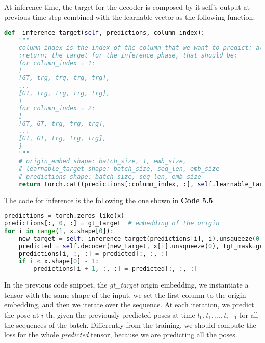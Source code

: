 At inference time, the target for the decoder is composed by it-self's output at previous time step combined with the learnable vector as the following function:
\begin{lstlisting}[captionpos=b, label={lst:lst-inference-target}, caption={Inference target}, language=Python]
def _inference_target(self, predictions, column_index):
    """
    column_index is the index of the column that we want to predict: always 0 < x < seq_len
    :return: the target for the inference phase, that should be:
    for column_index = 1:
    [
    [GT, trg, trg, trg, trg],
    ...
    [GT, trg, trg, trg, trg],
    ]
    for column_index = 2:
    [
    [GT, GT, trg, trg, trg],
    ...
    [GT, GT, trg, trg, trg],
    ]
    """
    # origin_embed shape: batch_size, 1, emb_size,
    # learnable_target shape: batch_size, seq_len, emb_size
    # predictions shape: batch_size, seq_len, emb_size
    return torch.cat((predictions[:column_index, :], self.learnable_target[column_index:, :]), dim=0)
\end{lstlisting}

The code for inference is the following the one shown in \textbf{Code 5.5}.
\begin{lstlisting}[captionpos=b, label={lst:lst-inference}, caption={Inference}, language=Python]
predictions = torch.zeros_like(x)
predictions[:, 0, :] = gt_target  # embedding of the origin
for i in range(1, x.shape[0]):
    new_target = self._inference_target(predictions[i], i).unsqueeze(0)
    predicted = self.decoder(new_target, x[i].unsqueeze(0), tgt_mask=generate_upper_triangular_mask(x.shape).to(self.device))
    predictions[i, :, :] = predicted[:, :, :]
    if i < x.shape[0] - 1:
        predictions[i + 1, :, :] = predicted[:, :, :]
\end{lstlisting}
In the previous code snippet, the \textit{gt\_target} origin embedding, we instantiate a tensor with the same shape of the input, we set the first column to the origin embedding, and then we iterate over the sequence.
At each iteration, we predict the pose at $i$-th, given the previously predicted poses at time $t_0, t_1, \dots, t_{i-1}$ for all the sequences of the batch.
Differently from the training, we should compute the loss for the whole \textit{predicted} tensor, because we are predicting all the poses.
